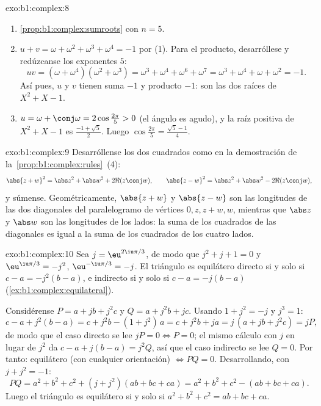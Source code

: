 \begin{solution}{exo:b1:complex:8}
\begin{enumerate}
  \item \cref{prop:b1:complex:sumroots} con $n = 5$.
  \item $u + v = \omega + \omega^2 + \omega^3 + \omega^4 = -1$ por (1).
        Para el producto, desarróllese y redúzcanse los exponentes  $5$:
        \[
        uv = (\omega + \omega^4)(\omega^2 + \omega^3)
        = \omega^3 + \omega^4 + \omega^6 + \omega^7
        = \omega^3 + \omega^4 + \omega + \omega^2 = -1 .
        \]
        Así pues, $u$ y $v$ tienen suma $-1$ y producto $-1$: son las
        dos raíces de $X^2 + X - 1$.
  \item $u = \omega + \conj\omega = 2\cos\frac{2\pi}{5} > 0$ (el ángulo
        es agudo), y la raíz positiva de $X^2 + X - 1$ es
        $\frac{-1 + \sqrt 5}{2}$. Luego $\cos\frac{2\pi}{5} =
        \frac{\sqrt 5 - 1}{4}$.
\end{enumerate}
\end{solution}

\begin{solution}{exo:b1:complex:9}
Desarróllense los dos cuadrados como en la demostración de
la~\cref{prop:b1:complex:rules}~(4):
\[
\abs{z + w}^2 = \abs z^2 + \abs w^2 + 2\Re(z\conj w),
\qquad
\abs{z - w}^2 = \abs z^2 + \abs w^2 - 2\Re(z\conj w),
\]
y súmense. Geométricamente, $\abs{z+w}$ y $\abs{z-w}$ son las
longitudes de las dos diagonales del paralelogramo de vértices
$0, z, z+w, w$, mientras que $\abs z$ y $\abs w$ son las longitudes de
los lados: la suma de los cuadrados de las diagonales es igual a la
suma de los cuadrados de los cuatro lados.
\end{solution}

\begin{solution}{exo:b1:complex:10}
Sea $j = \eu^{2\iu\pi/3}$, de modo que $j^2 + j + 1 = 0$ y
$\eu^{\iu\pi/3} = -j^2$, $\eu^{-\iu\pi/3} = -j$. El triángulo es
equilátero directo si y solo si $c - a = -j^2 (b - a)$, e indirecto si
y solo si $c - a = -j(b - a)$ (\cref{ex:b1:complex:equilateral}).

Considérense $P = a + jb + j^2 c$ y $Q = a + j^2 b + jc$. Usando
$1 + j^2 = -j$ y $j^3 = 1$:
\[
c - a + j^2(b - a) = c + j^2 b - (1 + j^2)\,a = c + j^2 b + ja
= j\,(a + jb + j^2 c) = jP,
\]
de modo que el caso directo se lee $jP = 0 \iff P = 0$; el mismo
cálculo con $j$ en lugar de $j^2$ da $c - a + j(b - a) = j^2 Q$, así
que el caso indirecto se lee $Q = 0$. Por tanto: equilátero (con
cualquier orientación) $\iff PQ = 0$. Desarrollando, con $j + j^2 = -1$:
\[
PQ = a^2 + b^2 + c^2 + (j + j^2)(ab + bc + ca)
= a^2 + b^2 + c^2 - (ab + bc + ca).
\]
Luego el triángulo es equilátero si y solo si
$a^2 + b^2 + c^2 = ab + bc + ca$.
\end{solution}


